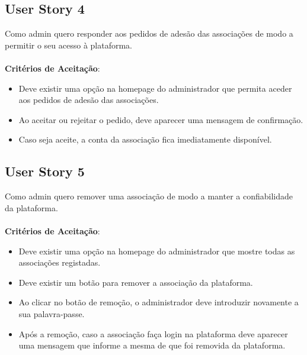 \documentclass[a4paper,11pt]{article}
\begin{document}
\subsection{User Story 4}
Como admin quero responder aos pedidos de adesão das associações de modo a permitir o seu acesso à plataforma.\\\\
\textbf{Critérios de Aceitação}:
\begin{itemize}
  \item Deve existir uma opção na homepage do administrador que permita aceder aos pedidos de adesão das associações.
  \item Ao aceitar ou rejeitar o pedido, deve aparecer uma mensagem de confirmação.
  \item Caso seja aceite, a conta da associação fica imediatamente disponível.
\end{itemize}

\subsection{User Story 5}
Como admin quero remover uma associação de modo a manter a confiabilidade da plataforma.\\\\
\textbf{Critérios de Aceitação}:
\begin{itemize}
  \item Deve existir uma opção na homepage do administrador que mostre todas as associações registadas.
  \item Deve existir um botão para remover a associação da plataforma.
  \item Ao clicar no botão de remoção, o administrador deve introduzir novamente a sua palavra-passe.
  \item Após a remoção, caso a associação faça login na plataforma deve aparecer uma mensagem que informe a mesma de que foi removida da plataforma.
\end{itemize}
\end{document}

